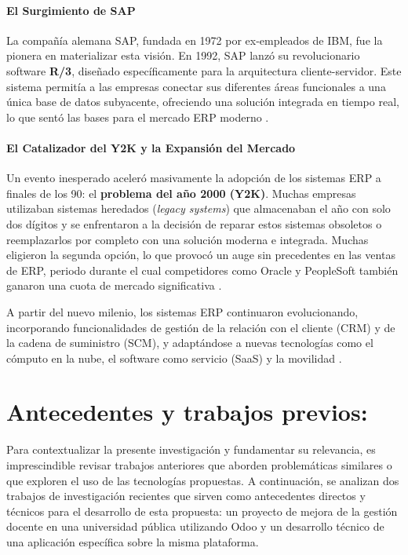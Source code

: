 \documentclass[12pt,letterpaper,spanish]{report}
\begin{document}
\paragraph{El Surgimiento de SAP} La compañía alemana SAP, fundada en 1972 por ex-empleados de IBM, fue la pionera en materializar esta visión. En 1992, SAP lanzó su revolucionario software \textbf{R/3}, diseñado específicamente para la arquitectura cliente-servidor. Este sistema permitía a las empresas conectar sus diferentes áreas funcionales a una única base de datos subyacente, ofreciendo una solución integrada en tiempo real, lo que sentó las bases para el mercado ERP moderno \cite{book}.

\paragraph{El Catalizador del Y2K y la Expansión del Mercado} Un evento inesperado aceleró masivamente la adopción de los sistemas ERP a finales de los 90: el \textbf{problema del año 2000 (Y2K)}. Muchas empresas utilizaban sistemas heredados (\textit{legacy systems}) que almacenaban el año con solo dos dígitos y se enfrentaron a la decisión de reparar estos sistemas obsoletos o reemplazarlos por completo con una solución moderna e integrada. Muchas eligieron la segunda opción, lo que provocó un auge sin precedentes en las ventas de ERP, periodo durante el cual competidores como Oracle y PeopleSoft también ganaron una cuota de mercado significativa \cite{book}.

A partir del nuevo milenio, los sistemas ERP continuaron evolucionando, incorporando funcionalidades de gestión de la relación con el cliente (CRM) y de la cadena de suministro (SCM), y adaptándose a nuevas tecnologías como el cómputo en la nube, el software como servicio (SaaS) y la movilidad \cite{book}.


\section{Antecedentes y trabajos previos:}
\label{sec:antecedentes}

Para contextualizar la presente investigación y fundamentar su relevancia, es imprescindible revisar trabajos anteriores que aborden problemáticas similares o que exploren el uso de las tecnologías propuestas. A continuación, se analizan dos trabajos de investigación recientes que sirven como antecedentes directos y técnicos para el desarrollo de esta propuesta: un proyecto de mejora de la gestión docente en una universidad pública utilizando Odoo y un desarrollo técnico de una aplicación específica sobre la misma plataforma.
\end{document}
